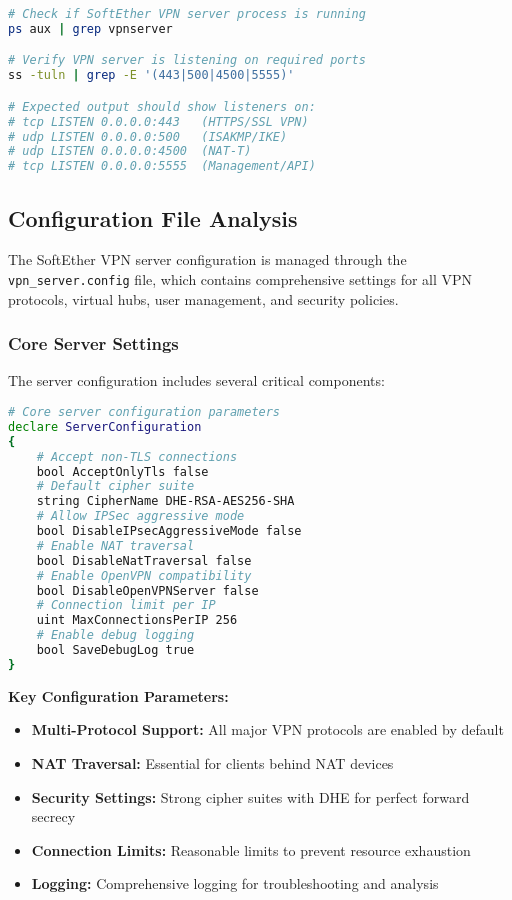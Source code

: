 \begin{lstlisting}[language=bash]
# Check if SoftEther VPN server process is running
ps aux | grep vpnserver

# Verify VPN server is listening on required ports
ss -tuln | grep -E '(443|500|4500|5555)'

# Expected output should show listeners on:
# tcp LISTEN 0.0.0.0:443   (HTTPS/SSL VPN)
# udp LISTEN 0.0.0.0:500   (ISAKMP/IKE)
# udp LISTEN 0.0.0.0:4500  (NAT-T)
# tcp LISTEN 0.0.0.0:5555  (Management/API)
\end{lstlisting}

\subsection{Configuration File Analysis}

The SoftEther VPN server configuration is managed through the \texttt{vpn\_server.config} file, which contains comprehensive settings for all VPN protocols, virtual hubs, user management, and security policies.

\subsubsection{Core Server Settings}

The server configuration includes several critical components:

\begin{lstlisting}[language=bash]
# Core server configuration parameters
declare ServerConfiguration
{
    # Accept non-TLS connections
    bool AcceptOnlyTls false    
    # Default cipher suite               
    string CipherName DHE-RSA-AES256-SHA       
    # Allow IPSec aggressive mode
    bool DisableIPsecAggressiveMode false      
    # Enable NAT traversal
    bool DisableNatTraversal false             
    # Enable OpenVPN compatibility
    bool DisableOpenVPNServer false            
    # Connection limit per IP
    uint MaxConnectionsPerIP 256               
    # Enable debug logging
    bool SaveDebugLog true                     
}
\end{lstlisting}

\textbf{Key Configuration Parameters:}

\begin{itemize}
    \item \textbf{Multi-Protocol Support:} All major VPN protocols are enabled by default
    \item \textbf{NAT Traversal:} Essential for clients behind NAT devices
    \item \textbf{Security Settings:} Strong cipher suites with DHE for perfect forward secrecy
    \item \textbf{Connection Limits:} Reasonable limits to prevent resource exhaustion
    \item \textbf{Logging:} Comprehensive logging for troubleshooting and analysis
\end{itemize}

